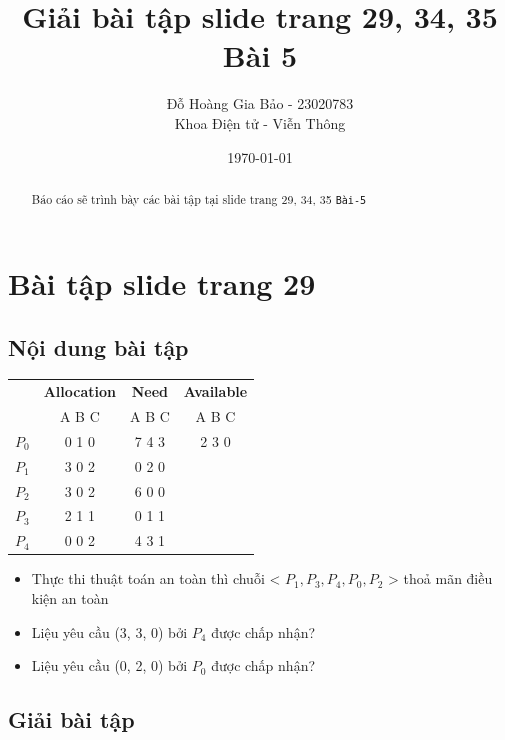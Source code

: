 \documentclass[12pt, letterpaper]{article}
\title{Giải bài tập slide trang 29, 34, 35 Bài 5}
\author{Đỗ Hoàng Gia Bảo - 23020783 \\ \small Khoa Điện tử - Viễn Thông}
\date{\today}
\begin{document}
\maketitle

\begin{abstract}
Báo cáo sẽ trình bày các bài tập tại slide trang 29, 34, 35 \texttt{Bài-5}
\end{abstract}
\newpage
\tableofcontents

\newpage
{}
\setcounter{page}{3} %

\section{Bài tập slide trang 29}
\subsection{Nội dung bài tập}
\begin{table}[H]
    \centering
    \begin{tabular}{|c|c|c|c|}
        \toprule
        & \textbf{Allocation} & \textbf{Need} & \textbf{Available} \\
        & A B C & A B C & A B C \\
        \midrule
        $P_0$ & 0 1 0 & 7 4 3 & 2 3 0 \\
        $P_1$ & 3 0 2 & 0 2 0 &\\
        $P_2$ & 3 0 2 & 6 0 0 &\\
        $P_3$ & 2 1 1 & 0 1 1 &\\
        $P_4$ & 0 0 2 & 4 3 1 &\\
        \bottomrule
    \end{tabular}
\end{table}

\begin{itemize}
    \item Thực thi thuật toán an toàn thì chuỗi < $P_1, P_3, P_4, P_0, P_2$ > thoả mãn điều kiện an toàn
    \item Liệu yêu cầu (3, 3, 0) bởi $P_4$ được chấp nhận?
    \item Liệu yêu cầu (0, 2, 0) bởi $P_0$ được chấp nhận?
\end{itemize}

\subsection{Giải bài tập}
\end{document}
